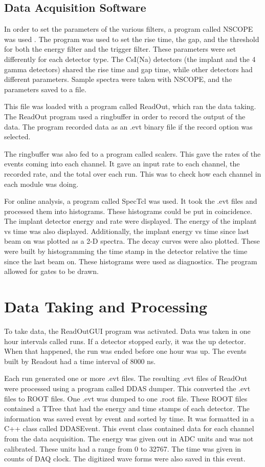 \documentclass[../MaxHughesThesis.tex]{subfiles}
\begin{document}
\subsection{Data Acquisition Software}
In order to set the parameters of the various filters, a program called NSCOPE was used \cite{DAQ17}.
The program was used to set the rise time, the gap, and the threshold for both the energy filter and the trigger filter.
These parameters were set differently for each detector type.
The CsI(Na) detectors (the implant and the 4 gamma detectors) shared the rise time and gap time, while other detectors had different parameters.
Sample spectra were taken with NSCOPE, and the parameters saved to a file.

This file was loaded with a program called ReadOut, which ran the data taking.
The ReadOut program used a ringbuffer in order to record the output of the data.
The program recorded data as an .evt binary file if the record option was selected.

The ringbuffer was also fed to a program called scalers.
This gave the rates of the events coming into each channel.
It gave an input rate to each channel, the recorded rate, and the total over each run.
This was to check how each channel in each module was doing.

For online analysis, a program called SpecTcl was used.
It took the .evt files and processed them into histograms.
These histograms could be put in coincidence.
The implant detector energy and rate were displayed.
The energy of the implant vs time was also displayed.
Additionally, the implant energy vs time since last beam on was plotted as a 2-D spectra.
The decay curves were also plotted.
These were built by histogramming the time stamp in the detector relative the time since the last beam on.
These histograms were used as diagnostics. 
The program allowed for gates to be drawn.

\section{Data Taking and Processing}
To take data, the ReadOutGUI program was activated. 
Data was taken in one hour intervals called runs.
If a detector stopped early, it was the up detector.
When that happened, the run was ended before one hour was up. 
The events built by Readout had a time interval of 8000 ns.

Each run generated one or more .evt files. 
The resulting .evt files of ReadOut were processed using a program called DDAS dumper.
This converted the .evt files to ROOT files.
One .evt was dumped to one .root file. 
These ROOT files contained a TTree that had the energy and time stamps of each detector.
The information was saved event by event and sorted by time. 
It was formatted in a C++ class called DDASEvent. 
This event class contained data for each channel from the data acquisition.
The energy was given out in ADC units and was not calibrated.
These units had a range from 0 to 32767.
The time was given in counts of DAQ clock.
The digitized wave forms were also saved in this event. 
\end{document}
